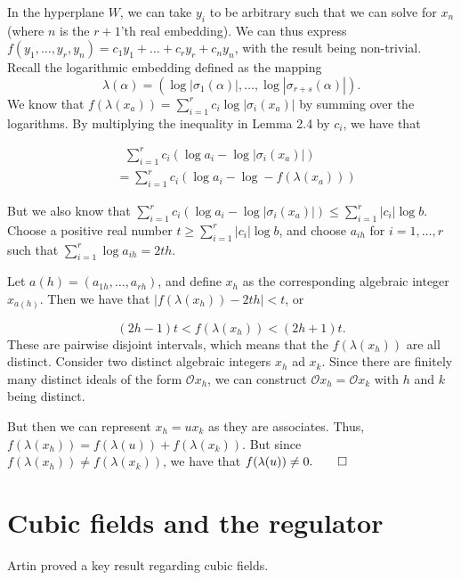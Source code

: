 \documentclass[a4paper, 12pt,oneside,openany]{book}
\begin{document}
In the hyperplane $W$, we can take $y_i$ to be arbitrary such that we can solve for $x_n$ (where $n$ is the $r+1$'th real embedding). We can thus express $f(y_1, \dots, y_r, y_n)=c_1y_1+\dots+c_ry_r+c_ny_n$, with the result being non-trivial. Recall the logarithmic embedding defined as the mapping $$\lambda(\alpha) = (\log |\sigma_{1}(\alpha)|, \dots, \log |\sigma_{r+s}(\alpha)|).$$ We know that $f(\lambda(x_a))=\sum\limits_{i=1}^r c_i \log |\sigma_i(x_a)|$ by summing over the logarithms. By multiplying the inequality in Lemma 2.4 by $c_i$, we have that 

\begin{align*}
    &\ \ \ \sum\limits_{i=1}^r c_i(\log a_i - \log |\sigma_i(x_a)|) \\
    &= \sum\limits_{i=1}^r c_i (\log a_i-\log - f(\lambda(x_a)))
\end{align*}

But we also know that $\sum\limits_{i=1}^r c_i(\log a_i - \log |\sigma_i(x_a)|) \leq \sum\limits_{i=1}^r |c_i| \log b$. Choose a positive real number $t \geq \sum\limits_{i=1}^r |c_i| \log b$, and choose $a_{ih}$ for $i=1, \dots, r$ such that $\sum\limits_{i=1}^r \log a_{ih}=2th.$ 

Let $a(h)=(a_{1h}, \dots, a_{rh})$, and define $x_h$ as the corresponding algebraic integer $x_{a(h)}.$ Then we have that $|f(\lambda(x_h))-2th|<t$, or

$$(2h-1)t < f(\lambda(x_h)) < (2h+1)t.$$ These are pairwise disjoint intervals, which means that the $f(\lambda(x_h))$ are all distinct. Consider two distinct algebraic integers $x_h$ ad $x_k$. Since there are finitely many distinct ideals of the form $\mathcal{O}x_h$, we can construct $\mathcal{O}x_h = \mathcal{O}x_k$ with $h$ and $k$ being distinct. 

But then we can represent $x_h=ux_k$ as they are associates. Thus, $f(\lambda(x_h)) = f(\lambda(u))+f(\lambda(x_k)).$ But since $f(\lambda(x_h)) \neq f(\lambda(x_k))$, we have that $f(\lambda(u)) \neq 0. \qed$ 

\section{Cubic fields and the regulator}

Artin proved a key result regarding cubic fields.

\end{document}

